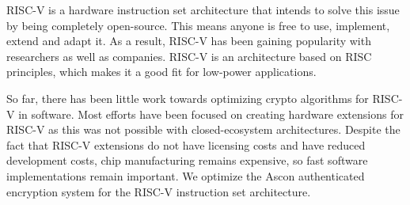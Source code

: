 RISC-V is a hardware instruction set architecture that intends to solve this
issue by being completely open-source. This means anyone is free to use,
implement, extend and adapt it. As a result, RISC-V has been gaining popularity
with researchers as well as companies. RISC-V is an architecture based on RISC
principles, which makes it a good fit for low-power applications.

So far, there has been little work towards optimizing crypto algorithms for
RISC-V in software. Most efforts have been focused on creating hardware
extensions for RISC-V as this was not possible with closed-ecosystem
architectures. Despite the fact that RISC-V extensions do not have licensing
costs and have reduced development costs, chip manufacturing remains expensive,
so fast software implementations remain important. We optimize the Ascon
authenticated encryption system for the RISC-V instruction set architecture.
